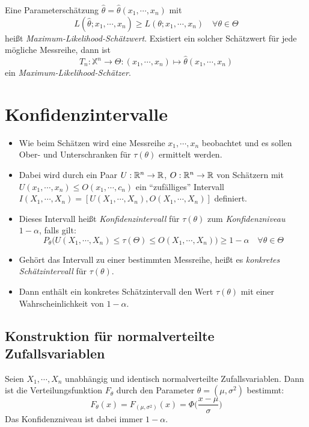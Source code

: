 		Eine Parameterschätzung \( \hat{\theta} = \hat{\theta}(x_1, \cdots, x_n) \) mit
		\begin{equation*}
			L(\hat{\theta}; x_1, \cdots, x_n) \geq L(\theta; x_1, \cdots, x_n) \quad \forall \theta \in \Theta
		\end{equation*}
		heißt \textit{Maximum-Likelihood-Schätzwert}. Existiert ein solcher Schätzwert für jede mögliche Messreihe, dann ist
		\begin{equation*}
			T_n : \mathbb{X}^n \rightarrow \Theta : (x_1, \cdots, x_n) \mapsto \hat{\theta} (x_1, \cdots, x_n)
		\end{equation*}
		ein \textit{Maximum-Likelihood-Schätzer}.

    \section{Konfidenzintervalle}
        \begin{itemize}
        	\item Wie beim Schätzen wird eine Messreihe \(x_1, \cdots, x_n\) beobachtet und es sollen Ober- und Unterschranken für \( \tau(\theta) \) ermittelt werden.
        	\item Dabei wird durch ein Paar \( U : \mathbb{R}^n \rightarrow \mathbb{R} \), \( O : \mathbb{R}^n \rightarrow \mathbb{R} \) von Schätzern mit \( U(x_1, \cdots, x_n) \leq O(x_1, \cdots, c_n) \) ein \enquote{zufälliges} Intervall \( I(X_1, \cdots, X_n) = [U(X_1, \cdots, X_n), O(X_1, \cdots, X_n)] \) definiert.
        	\item Dieses Intervall heißt \textit{Konfidenzintervall} für \(\tau(\theta)\) zum \textit{Konfidenzniveau} \( 1 - \alpha \), falls gilt:
	        	\begin{equation*}
		        	P_\theta\big(U(X_1, \cdots, X_n) \leq \tau(\Theta) \leq O(X_1, \cdots, X_n)\big) \geq 1 - \alpha \quad \forall \theta \in \Theta
	        	\end{equation*}
	        \item Gehört das Intervall zu einer bestimmten Messreihe, heißt es \textit{konkretes Schätzintervall} für \(\tau(\theta)\).
	        \item Dann enthält ein konkretes Schätzintervall den Wert \(\tau(\theta)\) mit einer Wahrscheinlichkeit von \( 1 - \alpha \).
        \end{itemize}

        \subsection{Konstruktion für normalverteilte Zufallsvariablen}
            Seien \(X_1, \cdots, X_n\) unabhängig und identisch normalverteilte Zufallsvariablen. Dann ist die Verteilungsfunktion \(F_\theta\) durch den Parameter \( \theta = (\mu, \sigma^2) \) bestimmt:
            \begin{equation*}
	            F_\theta(x) = F_{(\mu, \sigma^2)}(x) = \Phi\bigg(\frac{x - \mu}{\sigma}\bigg)
            \end{equation*}
            Das Konfidenzniveau ist dabei immer \( 1 - \alpha \).

